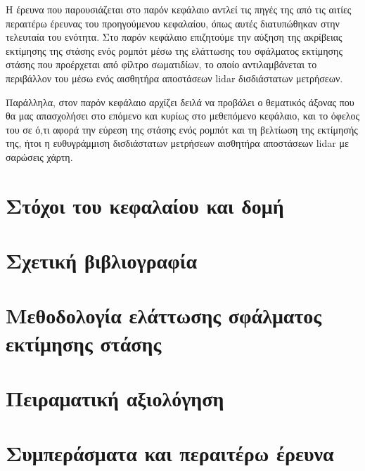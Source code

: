 Η έρευνα που παρουσιάζεται στο παρόν κεφάλαιο αντλεί τις πηγές της από τις
αιτίες περαιτέρω έρευνας του προηγούμενου κεφαλαίου, όπως αυτές διατυπώθηκαν
στην τελευταία του ενότητα. Στο παρόν κεφάλαιο επιζητούμε την αύξηση της
ακρίβειας εκτίμησης της στάσης ενός ρομπότ μέσω της ελάττωσης του σφάλματος
εκτίμησης στάσης που προέρχεται από φίλτρο σωματιδίων, το οποίο αντιλαμβάνεται
το περιβάλλον του μέσω ενός αισθητήρα αποστάσεων lidar δισδιάστατων μετρήσεων.

Παράλληλα, στον παρόν κεφάλαιο αρχίζει δειλά να προβάλει ο θεματικός άξονας που
θα μας απασχολήσει στο επόμενο και κυρίως στο μεθεπόμενο κεφάλαιο, και το όφελος
του σε ό,τι αφορά την εύρεση της στάσης ενός ρομπότ και τη βελτίωση της
εκτίμησής της, ήτοι η ευθυγράμμιση δισδιάστατων μετρήσεων αισθητήρα αποστάσεων
lidar με σαρώσεις χάρτη.

\section{Στόχοι του κεφαλαίου και δομή}
  \label{section:02_02_01}
  

\section{Σχετική βιβλιογραφία}
  \label{section:02_02_02}
  

\section{Μεθοδολογία ελάττωσης σφάλματος εκτίμησης στάσης}
  \label{section:02_02_03}
  

\section{Πειραματική αξιολόγηση}
  \label{section:02_02_04}
  

\section{Συμπεράσματα και περαιτέρω έρευνα}
  \label{section:02_02_05}
  
